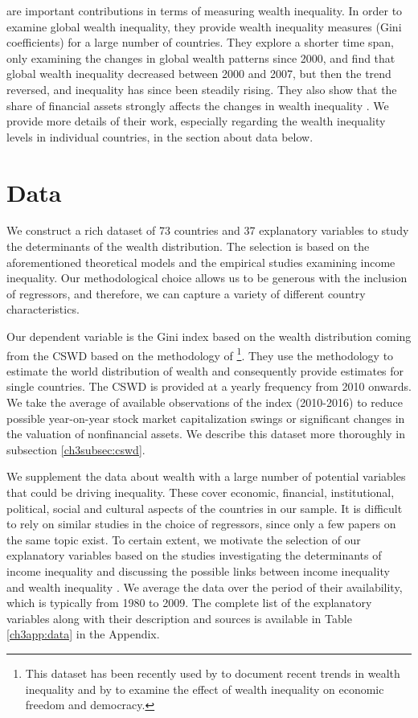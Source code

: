 \begin{refsection}
\textcite{daviesetal2017,daviesetal2011,davies2000distribution} are important contributions in terms of measuring wealth inequality. In order to examine global wealth inequality, they provide wealth inequality measures (Gini coefficients) for a large number of countries. They explore a shorter time span, only examining the changes in global wealth patterns since 2000, and find that global wealth inequality decreased between 2000 and 2007, but then the trend reversed, and inequality has since been steadily rising. They also show that the share of financial assets strongly affects the changes in wealth inequality \parencite{daviesetal2017}. We provide more details of their work, especially regarding the wealth inequality levels in individual countries, in the section about data below.
%
%
%
%
%
\section{Data}
\label{ch3sec:data}
We construct a rich dataset of 73 countries and 37 explanatory variables to study the determinants of the wealth distribution. The selection is based on the aforementioned theoretical models and the empirical studies examining income inequality. Our methodological choice allows us to be generous with the inclusion of regressors, and therefore, we can capture a variety of different country characteristics. 

Our dependent variable is the Gini index based on the wealth distribution coming from the \ac{CSWD} based on the methodology of \textcite{daviesetal2011,daviesetal2017}\footnote{This dataset has been recently used by \textcite{anand} to document recent trends in wealth inequality and by \textcite{islam} to examine the effect of wealth inequality on economic freedom and democracy.}. They use the methodology to estimate the world distribution of wealth and consequently provide estimates for single countries. The \ac{CSWD} is provided at a yearly frequency from 2010 onwards. We take the average of available observations of the index (2010-2016) to reduce possible year-on-year stock market capitalization swings or significant changes in the valuation of nonfinancial assets. We describe this dataset more thoroughly in subsection \ref{ch3subsec:cswd}.

We supplement the data about wealth with a large number of potential variables that could be driving inequality. These cover economic, financial, institutional, political, social and cultural aspects of the countries in our sample. It is difficult to rely on similar studies in the choice of regressors, since only a few papers on the same topic exist. To certain extent, we motivate the selection of our explanatory variables based on the studies investigating the determinants of income inequality and discussing the possible links between income inequality and wealth inequality \parencite{roine2015long,de2017finance}. We average the data over the period of their availability, which is typically from 1980 to 2009. The complete list of the explanatory variables along with their description and sources is available in Table \ref{ch3app:data} in the Appendix.


\end{refsection}
